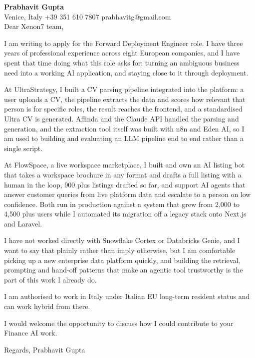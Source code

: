 \documentclass[a4paper,10.5pt]{article}
\begin{document}
\textbf{Prabhavit Gupta}\\
Venice, Italy \textbar{} +39 351 610 7807 \textbar{} prabhavitg@gmail.com\\[10pt]
Dear Xenon7 team,

I am writing to apply for the Forward Deployment Engineer role. I have three years of professional experience across eight European companies, and I have spent that time doing what this role asks for: turning an ambiguous business need into a working AI application, and staying close to it through deployment.

At UltraStrategy, I built a CV parsing pipeline integrated into the platform: a user uploads a CV, the pipeline extracts the data and scores how relevant that person is for specific roles, the result reaches the frontend, and a standardised Ultra CV is generated. Affinda and the Claude API handled the parsing and generation, and the extraction tool itself was built with n8n and Eden AI, so I am used to building and evaluating an LLM pipeline end to end rather than a single script.

At FlowSpace, a live workspace marketplace, I built and own an AI listing bot that takes a workspace brochure in any format and drafts a full listing with a human in the loop, 900 plus listings drafted so far, and support AI agents that answer customer queries from live platform data and escalate to a person on low confidence. Both run in production against a system that grew from 2,000 to 4,500 plus users while I automated its migration off a legacy stack onto Next.js and Laravel.

I have not worked directly with Snowflake Cortex or Databricks Genie, and I want to say that plainly rather than imply otherwise, but I am comfortable picking up a new enterprise data platform quickly, and building the retrieval, prompting and hand-off patterns that make an agentic tool trustworthy is the part of this work I already do.

I am authorised to work in Italy under Italian EU long-term resident status and can work hybrid from there.

I would welcome the opportunity to discuss how I could contribute to your Finance AI work.

Regards,
Prabhavit Gupta
\end{document}
